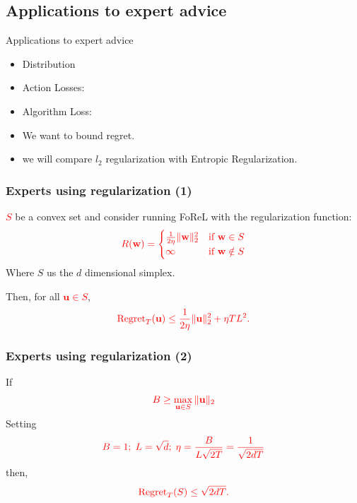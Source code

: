 \documentclass[handout]{beamer}
\begin{document}
\begin{small}
\subsection{Applications to expert advice}

\begin{frame}{Applications to expert advice}
  \begin{itemize}
    \item Distribution 
    \item Action Losses: 
    \item Algorithm Loss: 
    \item We want to bound regret.
    \item we will compare $l_2$ regularization with Entropic
      Regularization.
  \end{itemize}
\end{frame}


\begin{frame}
    \frametitle{Experts using  regularization (1)}
    \textcolor{red}{$S$} 
    be a convex set and consider running FoReL with the regularization function:
    \[
    \textcolor{red}{R(\mathbf{w}) = 
    \begin{cases} 
    \frac{1}{2\eta} \|\mathbf{w}\|_2^2 & \text{if } \mathbf{w} \in S \\ 
    \infty & \text{if } \mathbf{w} \notin S 
    \end{cases}}
    \]
    Where $S$ us the $d$ dimensional simplex.

    Then, for all 
    \textcolor{red}{$\mathbf{u} \in S$},
    \[
    \textcolor{red}{\operatorname{Regret}_T(\mathbf{u}) \leq \frac{1}{2\eta} \|\mathbf{u}\|_2^2 + \eta T L^2.}
    \]
\end{frame}

\begin{frame}
    \frametitle{Experts using  regularization (2)}
    If 
    \[
    \textcolor{red}{B \geq \max_{\mathbf{u} \in S} \|\mathbf{u}\|_2}
    \]
    Setting
    \[
    \textcolor{red}{B=1;\; L=\sqrt{d};\;\eta = \frac{B}{L \sqrt{2T}}=\frac{1}{\sqrt{2dT}}}
    \]
    then,
    \[
    \textcolor{red}{\operatorname{Regret}_T(S) \leq \sqrt{2dT}.}
    \]
\end{frame}



\end{small}
\end{document}
